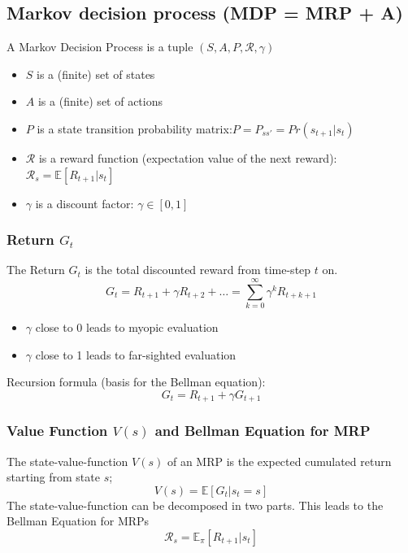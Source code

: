 \subsection{Markov decision process (MDP = MRP + A)}
A Markov Decision Process is a tuple \((S,A,P,\mathcal{R},\gamma)\)
\begin{itemize}
    \item \(S\) is a (finite) set of states
    \item \(A\) is a (finite) set of actions
    \item \(P\) is a state transition probability matrix:\(P = P_{ss'} = Pr(s_{t+1}|s_t)\)
    \item \(\mathcal{R}\) is a reward function (expectation value of the next reward): \(\mathcal{R}_s = \mathbb{E}\left[R_{t+1}|s_t\right]\)
    \item \(\gamma\) is a discount factor: \(\gamma \in \left[0,1\right]\)
\end{itemize}

\subsubsection{Return \(G_t\)}
The Return \(G_t\) is the total discounted reward from time-step \(t\) on.
\[
G_t = R_{t+1} + \gamma R_{t+2} + \dots = \sum_{k = 0}^{\infty} \gamma^k R_{t+k+1}
\]
\begin{itemize}
    \item \(\gamma\) close to 0 leads to myopic evaluation
    \item \(\gamma\) close to 1 leads to far-sighted evaluation
\end{itemize}
Recursion formula (basis for the Bellman equation):
\[
G_t = R_{t+1} + \gamma G_{t+1}
\]
\subsubsection{Value Function \(V(s)\) and Bellman Equation for MRP}
The state-value-function \(V(s)\) of an MRP is the expected cumulated return starting from state \(s\);
\[
V(s) = \mathbb{E}\left[G_t|s_t = s\right]
\]
The state-value-function can be decomposed in two parts.
This leads to the Bellman Equation for MRPs
\[
\mathcal{R}_s = \mathbb{E}_\pi\left[R_{t+1}|s_t\right]
\]